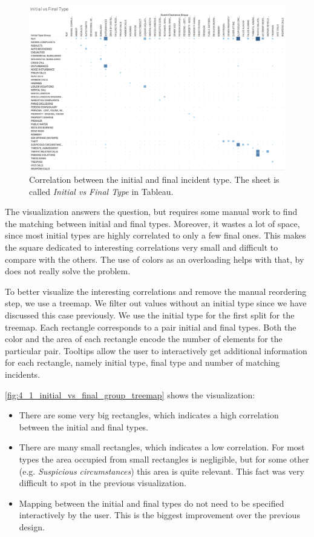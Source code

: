 \begin{figure}[h]
	\centering
	\includegraphics[width=\columnwidth]{figures/4_1_initial_vs_final_group_heatmap}
	\caption{Correlation between the initial and final incident type. The sheet is called \textit{Initial vs Final Type} in Tableau.}
	\label{fig:4_1_initial_vs_final_group_heatmap}
\end{figure}

The visualization answers the question, but requires some manual work to find the matching between initial and final types.
Moreover, it wastes a lot of space, since most initial types are highly correlated to only a few final ones.
This makes the square dedicated to interesting correlations very small and difficult to compare with the others.
The use of colors as an overloading helps with that, by does not really solve the problem. 

To better visualize the interesting correlations and remove the manual reordering step, we use a treemap.
We filter out values without an initial type since we have discussed this case previously.
We use the initial type for the first split for the treemap.
Each rectangle corresponds to a pair initial and final types.
Both the color and the area of each rectangle encode the number of elements for the particular pair.
Tooltips allow the user to interactively get additional information for each rectangle, namely initial type, final type and number of matching incidents.

\cref{fig:4_1_initial_vs_final_group_treemap} shows the visualization:
\begin{itemize}
	\item There are some very big rectangles, which indicates a high correlation between the initial and final types.
	\item There are many small rectangles, which indicates a low correlation. For most types the area occupied from small rectangles is negligible, but for some other (e.g. \textit{Suspicious circumstances}) this area is quite relevant. This fact was very difficult to spot in the previous visualization.
	\item Mapping between the initial and final types do not need to be specified interactively by the user. This is the biggest improvement over the previous design.
\end{itemize}

